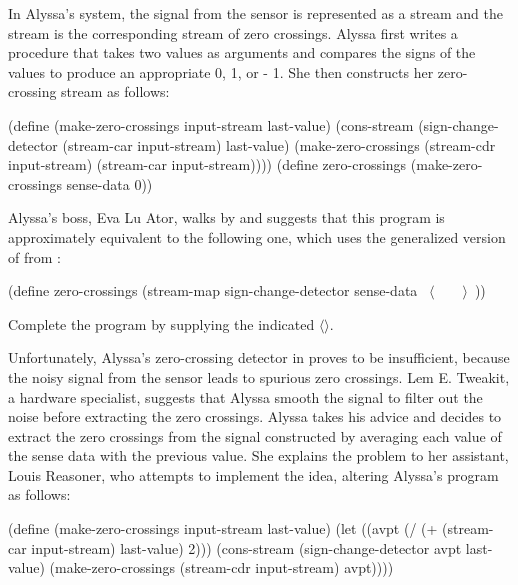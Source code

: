\begin{exerciseGroup}
In Alyssa's system, the signal from the sensor is represented as a stream
 and the stream  is the corresponding
stream of zero crossings.  Alyssa first writes a procedure
 that takes two values as arguments and compares the
signs of the values to produce an appropriate 0, 1, or - 1.  She then
constructs her zero-crossing stream as follows:

\begin{codeBlock}
(define (make-zero-crossings input-stream last-value)
  (cons-stream
   (sign-change-detector
    (stream-car input-stream)
    last-value)
   (make-zero-crossings
    (stream-cdr input-stream)
    (stream-car input-stream))))
(define zero-crossings
  (make-zero-crossings sense-data 0))
\end{codeBlock}

Alyssa's boss, Eva Lu Ator, walks by and suggests that this program is
approximately equivalent to the following one, which uses the generalized
version of  from :

\begin{codeBlock}
(define zero-crossings
  (stream-map sign-change-detector
              sense-data
              ~\(\langle \)~~~~\(\rangle \)~))
\end{codeBlock}

Complete the program by supplying the indicated \( \langle \)\( \rangle \).

\label{Exercise 3.75}
 Unfortunately, Alyssa's
zero-crossing detector in  proves to be insufficient,
because the noisy signal from the sensor leads to spurious zero crossings.  Lem
E.  Tweakit, a hardware specialist, suggests that Alyssa smooth the signal to
filter out the noise before extracting the zero crossings.  Alyssa takes his
advice and decides to extract the zero crossings from the signal constructed by
averaging each value of the sense data with the previous value.  She explains
the problem to her assistant, Louis Reasoner, who attempts to implement the
idea, altering Alyssa's program as follows:

\begin{codeBlock}
(define (make-zero-crossings input-stream last-value)
  (let ((avpt (/ (+ (stream-car input-stream)
                    last-value)
                 2)))
    (cons-stream
     (sign-change-detector avpt last-value)
     (make-zero-crossings
      (stream-cdr input-stream) avpt))))
\end{codeBlock}


\end{exerciseGroup}
